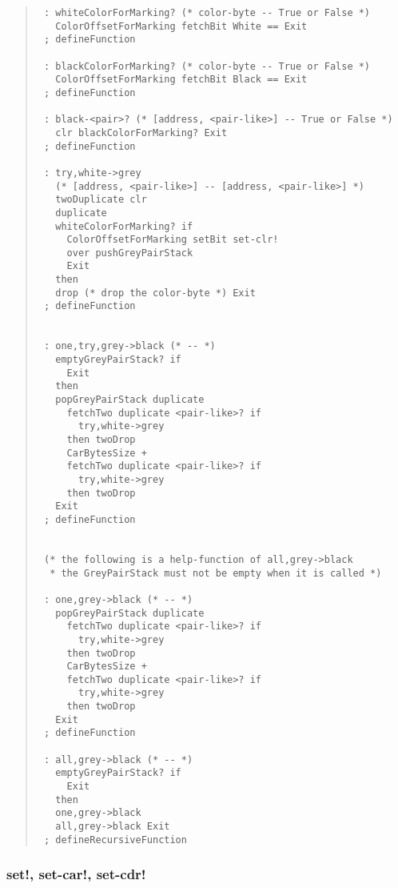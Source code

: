 \documentclass[a4paper]{article}
\begin{document}
\begin{quote}
\begin{verbatim}
 : whiteColorForMarking? (* color-byte -- True or False *)
   ColorOffsetForMarking fetchBit White == Exit
 ; defineFunction

 : blackColorForMarking? (* color-byte -- True or False *)
   ColorOffsetForMarking fetchBit Black == Exit
 ; defineFunction

 : black-<pair>? (* [address, <pair-like>] -- True or False *)
   clr blackColorForMarking? Exit
 ; defineFunction

 : try,white->grey
   (* [address, <pair-like>] -- [address, <pair-like>] *)
   twoDuplicate clr
   duplicate
   whiteColorForMarking? if
     ColorOffsetForMarking setBit set-clr!
     over pushGreyPairStack
     Exit
   then
   drop (* drop the color-byte *) Exit
 ; defineFunction


 : one,try,grey->black (* -- *)
   emptyGreyPairStack? if
     Exit
   then
   popGreyPairStack duplicate
     fetchTwo duplicate <pair-like>? if
       try,white->grey
     then twoDrop
     CarBytesSize +
     fetchTwo duplicate <pair-like>? if
       try,white->grey
     then twoDrop
   Exit
 ; defineFunction


 (* the following is a help-function of all,grey->black
  * the GreyPairStack must not be empty when it is called *)

 : one,grey->black (* -- *)
   popGreyPairStack duplicate
     fetchTwo duplicate <pair-like>? if
       try,white->grey
     then twoDrop
     CarBytesSize +
     fetchTwo duplicate <pair-like>? if
       try,white->grey
     then twoDrop
   Exit
 ; defineFunction

 : all,grey->black (* -- *)
   emptyGreyPairStack? if
     Exit
   then
   one,grey->black
   all,grey->black Exit
 ; defineRecursiveFunction
\end{verbatim}
\end{quote}


\subsubsection{set!, set-car!, set-cdr!}
\end{document}
